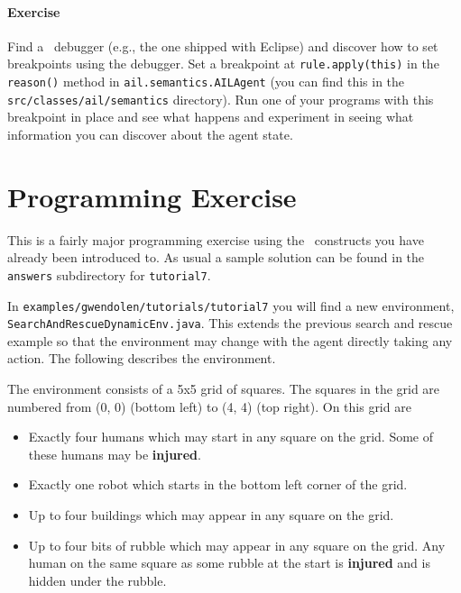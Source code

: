\begin{sloppypar}
\paragraph{Exercise} Find a \java\ debugger (e.g., the one shipped
with Eclipse) and discover how to set breakpoints using the debugger.
Set a breakpoint at \texttt{rule.apply(this)} in the \texttt{reason()}
method in \texttt{ail.semantics.AILAgent} (you can find this in the
\texttt{src/classes/ail/semantics} directory).  Run one of your
programs with this breakpoint in place and see what happens and
experiment in seeing what information you can discover about the agent
state. 
\end{sloppypar}

\section{Programming Exercise}
This is a fairly major programming exercise using the
\gwendolen\ constructs you have already been introduced to.  As usual
a sample solution can be found in the \texttt{answers} subdirectory
for \texttt{tutorial7}. 

In \texttt{examples/gwendolen/tutorials/tutorial7} you will find a new
environment,
\texttt{SearchAndRescueDynamicEnv.java}.  This extends the previous search and rescue example so
that the environment may change with the agent directly taking any
action.  The following describes the environment. 

The environment consists of a 5x5 grid of squares.  The squares in the
grid are numbered from (0, 0) (bottom left) to (4, 4) (top right).  On
this grid are 
\begin{itemize}
\item Exactly four humans which may start in any square on the grid.
  Some of these humans may be {\bf injured}. 
\item Exactly one robot which starts in the bottom left corner of the grid.
\item Up to four buildings which may appear in any square on the grid.
\item Up to four bits of rubble which may appear in any square on the
  grid.  Any human on the same square as some rubble at the start is
  {\bf injured} and is hidden under the rubble. 
\end{itemize}

